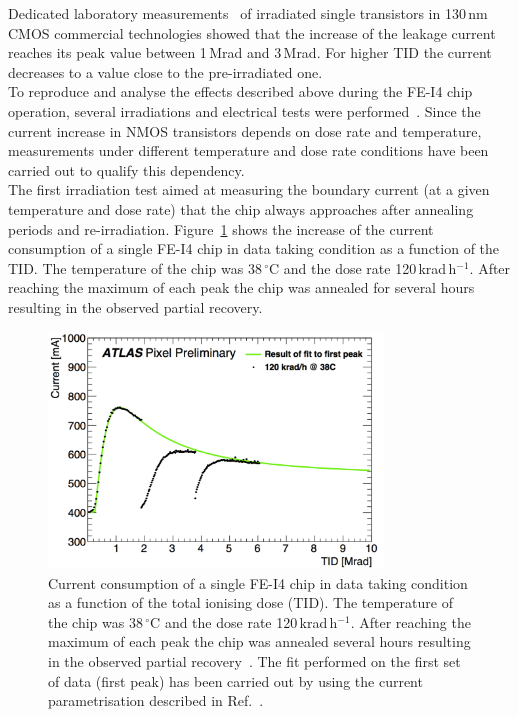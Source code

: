 Dedicated laboratory measurements~\cite{LAURA} of irradiated single transistors in 130\,nm CMOS commercial technologies showed that the increase of the leakage current reaches its peak value between 1\,Mrad and 3\,Mrad. For higher TID the current decreases to a value close to the pre-irradiated one. \\
To reproduce and analyse the effects described above during the FE-I4 chip operation, several  irradiations and electrical tests 
were performed~\cite{TaskForceNote}. Since the current increase in NMOS transistors depends on dose rate and temperature, measurements under different temperature and dose rate conditions have been carried out to qualify this dependency.\\
The first irradiation test aimed at measuring the boundary current (at a given temperature and dose rate) that the chip always approaches after annealing periods and re-irradiation. Figure~\ref{fig:ThreePeaks} shows the increase of the current consumption of a single FE-I4 chip in data taking condition as a function of the TID. The temperature of the chip was 38\,$^\circ$C and the dose rate 120\,krad\,h$^{-1}$. After reaching the maximum of each peak the chip was annealed for several hours resulting in the observed partial recovery. 
%
\begin{figure}[h!]
\centering
\includegraphics[width=3.5in]{figures/ElectronicsChapter/ATLAS/ThreePeaks.pdf}
\caption{Current consumption of a single FE-I4 chip in data taking condition as a function of the total ionising dose (TID). The temperature of the chip was 38\,$^\circ$C and the dose rate 120\,krad\,h$^{-1}$. After reaching the maximum of each peak the chip was annealed several hours resulting in the observed partial recovery~\cite{TaskForceNote}. The fit performed on the first set of data (first peak) has been carried out by using the current parametrisation described in Ref.~\cite{MALTE}.}
\label{fig:ThreePeaks}
\end{figure} 
